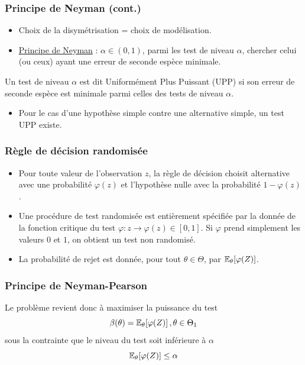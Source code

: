\begin{frame}
\frametitle{Principe de Neyman (cont.)}
\begin{itemize}
\item Choix de la  disymétrisation  = choix de modélisation.
\item \underline{\alert{Principe de Neyman}}  : $\alpha \in (0,1)$, parmi les test de niveau $\alpha$, chercher celui (ou ceux) ayant \alert{une erreur de seconde espèce minimale}.
\end{itemize}
\begin{df}
Un test de niveau $\alpha$ est dit \alert{Uniformément Plus Puissant} (UPP) si son erreur de seconde espèce est minimale parmi celles des tests de niveau $\alpha$.
\end{df}
\begin{itemize}
\item Pour le cas d'une \alert{hypothèse simple} contre une \alert{alternative simple}, un test UPP existe.
\end{itemize}
\end{frame}

\begin{frame}
\frametitle{Règle de décision randomisée}
\begin{itemize}
\item Pour toute valeur de l'observation $z$, la règle de décision choisit alternative avec une probabilité $\varphi(z)$ et l'hypothèse nulle avec la probabilité $1 - \varphi(z)$.
\item Une procédure de test randomisée est \alert{entièrement spécifiée} par la donnée de la \alert{fonction critique} du test $\varphi: z \to \varphi(z) \in [0,1]$. Si $\varphi$ prend simplement les valeurs $0$ et $1$, on obtient un test non randomisé.
\item La \alert{probabilité de rejet} est donnée, pour tout $\theta \in \Theta$, par $\operatorname{{\mathbb E}}_\theta[\varphi(Z)]$.
\end{itemize}
\end{frame}

\begin{frame}
\frametitle{Principe de Neyman-Pearson}
Le problème revient donc à maximiser la \alert{puissance du test}
\[
\beta(\theta)= \operatorname{{\mathbb E}}_{\theta}[\varphi(Z)] \,, \theta \in \Theta_1
\]
sous la contrainte que le niveau du test soit inférieure à $\alpha$
\[
\operatorname{{\mathbb E}}_\theta[\varphi(Z)] \leq \alpha
\]
\end{frame}

